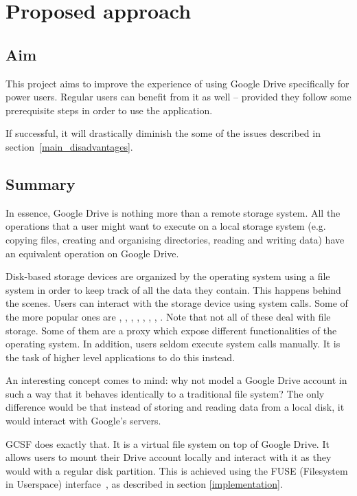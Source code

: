 \chapter{Proposed approach}\label{proposed_approach}

\section{Aim}

This project aims to improve the experience of using Google Drive specifically for power users. Regular users can benefit from it as well -- provided they follow some prerequisite steps in order to use the application.

If successful, it will drastically diminish the some of the issues described in section~\ref{main_disadvantages}.

\section{Summary}

In essence, Google Drive is nothing more than a remote storage system. All the operations that a user might want to execute on a local storage system (e.g. copying files, creating and organising directories, reading and writing data) have an equivalent operation on Google Drive.

Disk-based storage devices are organized by the operating system using a file system in order to keep track of all the data they contain. This happens behind the scenes. Users can interact with the storage device using system calls. Some of the more popular ones are , , , , , , , . Note that not all of these deal with file storage. Some of them are a proxy which expose different functionalities of the operating system. In addition, users seldom execute system calls manually. It is the task of higher level applications to do this instead.

An interesting concept comes to mind: why not model a Google Drive account in such a way that it behaves identically to a traditional file system? The only difference would be that instead of storing and reading data from a local disk, it would interact with Google's servers.

GCSF does exactly that. It is a virtual file system on top of Google Drive. It allows users to mount their Drive account locally and interact with it as they would with a regular disk partition. This is achieved using the FUSE (Filesystem in Userspace) interface~\cite{libfuse}, as described in section \ref{implementation}.

